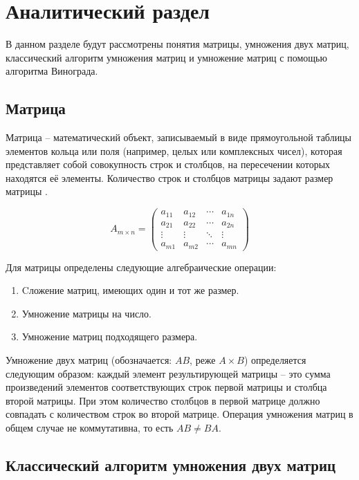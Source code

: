 \chapter{Аналитический раздел}

В данном разделе будут рассмотрены понятия матрицы, умножения двух матриц, классический алгоритм умножения матриц и умножение матриц с помощью алгоритма Винограда.

\section{Матрица}

Матрица -- математический объект, записываемый в виде прямоугольной таблицы элементов кольца или поля (например, целых или комплексных чисел), которая представляет собой совокупность строк и столбцов, на пересечении которых находятся её элементы. Количество строк и столбцов матрицы задают размер матрицы \cite{Mtr}.


\begin{equation*}
	A_{m \times n} =
	\begin{pmatrix}
		a_{11} & a_{12} & \cdots & a_{1n} \\
		a_{21} & a_{22} & \cdots & a_{2n} \\
		\vdots  & \vdots  & \ddots & \vdots  \\
		a_{m1} & a_{m2} & \cdots & a_{mn}
	\end{pmatrix}
\end{equation*}

Для матрицы определены  следующие алгебраические операции: 

\begin{enumerate}[label={\arabic*)}]
	\item Cложение матриц, имеющих один и тот же размер.
	\item Умножение матрицы на число.
	\item Умножение матриц подходящего размера.
\end{enumerate}

Умножение двух матриц (обозначается: $AB$, реже $A \times B$) определяется следующим образом: каждый элемент результирующей матрицы -- это сумма произведений элементов соответствующих строк первой матрицы и столбца второй матрицы. При этом количество столбцов в первой матрице должно совпадать с количеством строк во второй матрице. Операция умножения матриц в общем случае не коммутативна, то есть $AB \neq BA$.

\section{Классический алгоритм умножения двух матриц}

